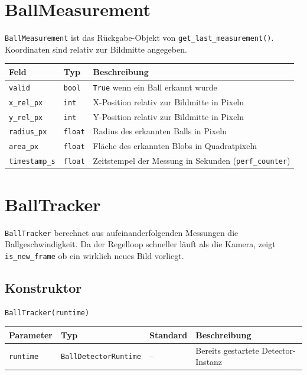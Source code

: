 \documentclass[11pt, a4paper]{scrreprt}
\begin{document}
\section{BallMeasurement}

\texttt{BallMeasurement} ist das Rückgabe-Objekt von \texttt{get\_last\_measurement()}.
Koordinaten sind relativ zur Bildmitte angegeben.

\begin{tabularx}{\textwidth}{l l X}
  \toprule
  Feld & Typ & Beschreibung \\
  \midrule
  \texttt{valid} & \texttt{bool} & \texttt{True} wenn ein Ball erkannt wurde \\
  \texttt{x\_rel\_px} & \texttt{int} & X-Position relativ zur Bildmitte in Pixeln \\
  \texttt{y\_rel\_px} & \texttt{int} & Y-Position relativ zur Bildmitte in Pixeln \\
  \texttt{radius\_px} & \texttt{float} & Radius des erkannten Balls in Pixeln \\
  \texttt{area\_px} & \texttt{float} & Fläche des erkannten Blobs in Quadratpixeln \\
  \texttt{timestamp\_s} & \texttt{float} & Zeitstempel der Messung in Sekunden (\texttt{perf\_counter}) \\
  \bottomrule
\end{tabularx}

\section{BallTracker}

\texttt{BallTracker} berechnet aus aufeinanderfolgenden Messungen die
Ballgeschwindigkeit. Da der Regelloop schneller läuft als die Kamera,
zeigt \texttt{is\_new\_frame} ob ein wirklich neues Bild vorliegt.

\subsection*{Konstruktor}

\begin{lstlisting}
BallTracker(runtime)
\end{lstlisting}

\begin{tabularx}{\textwidth}{l l l X}
  \toprule
  Parameter & Typ & Standard & Beschreibung \\
  \midrule
  \texttt{runtime} & \texttt{BallDetectorRuntime} & – & Bereits gestartete Detector-Instanz \\
  \bottomrule
\end{tabularx}
\end{document}
